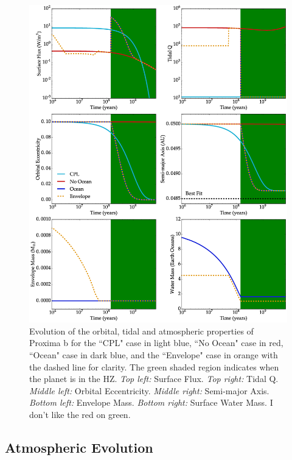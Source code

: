 \documentclass[preprint,12pt]{aastex}
\newcommand{\xxx}[1]{{\color{red} #1}} %
\begin{document}
\begin{figure} 
\centering
\includegraphics[width=1.0\textwidth,height=0.9\textheight]{tidal_hec.eps}
\caption{Evolution of the orbital, tidal and atmospheric properties of
  Proxima b for the ``CPL" case in light blue, ``No Ocean" case in
  red, ``Ocean" case in dark blue, and the ``Envelope" case in orange
  with the dashed line for clarity.  The green shaded region indicates
  when the planet is in the HZ. {\it Top left:} Surface Flux. {\it Top
    right:} Tidal Q. {\it Middle left:} Orbital Eccentricity. {\it
    Middle right:} Semi-major Axis. {\it Bottom left:} Envelope
  Mass. {\it Bottom right:} Surface Water Mass. \xxx{I don't like the red on green.}}
\label{fig:tidal_hec}
\end{figure}


\subsection{Atmospheric Evolution}
\label{sec:results:atmesc}
\end{document}
